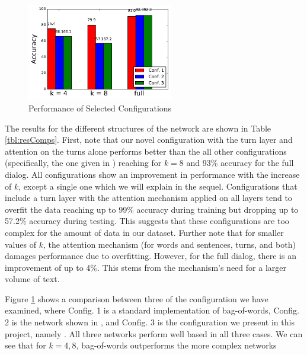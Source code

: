 \begin{figure}[]
    \hspace*{-0.8cm}
    \centering
        \centering
        \includegraphics[trim=0cm 0.5cm 0cm 0cm, width=2.5in]{exp/configs.pdf}
        \caption{Performance of Selected Configurations}
        \label{graph:quality}
\end{figure}


The results for the different structures of the network are shown in Table \ref{tbl:resComps}. 
First, note that our novel configuration with the turn layer and attention on the turns alone 
performs better than the all other configurations (specifically, the one given in \cite{attention}) 
reaching  for $k=8$ and 93\% accuracy for the full dialog. 
All configurations show an improvement in performance with the increase of $k$, 
except a single one which we will explain in the sequel. 
Configurations that include a turn layer with the attention mechanism applied on all layers 
tend to overfit the data reaching up to 99\% accuracy during training but 
dropping up to 57.2\% accuracy during testing. 
This suggests that these configurations are too complex for the amount of data in our dataset. 
Further note that for smaller values of $k$, the attention mechanism 
(for words and sentences, turns, and both) damages performance due to overfitting. 
However, for the full dialog, there is an improvement of up to 4\%. 
This stems from the mechanism's need for a larger volume of text.

Figure \ref{graph:quality} shows a comparison between three of the configuration 
we have examined, where Config. 1 is a standard implementation of bag-of-words, 
Config. 2 is the network shown in \cite{attention}, and Config. 3 is the configuration 
we present in this project, namely . 
All three networks perform well based in all three cases. 
We can see that for $k=4,8$, bag-of-words outperforms the more complex 
networks 

